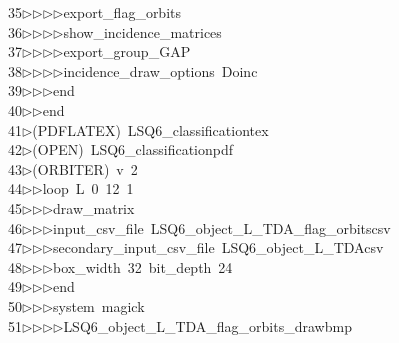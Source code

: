 \begin{tabbing}
35\>$\triangleright$\>$\triangleright$\>$\triangleright$\>$\triangleright$\>export\_flag\_orbits\ \\[0pt]
36\>$\triangleright$\>$\triangleright$\>$\triangleright$\>$\triangleright$\>show\_incidence\_matrices\ \\[0pt]
37\>$\triangleright$\>$\triangleright$\>$\triangleright$\>$\triangleright$\>export\_group\_GAP\ \\[0pt]
38\>$\triangleright$\>$\triangleright$\>$\triangleright$\>$\triangleright$\>incidence\_draw\_options\ Doinc\ \\[0pt]
39\>$\triangleright$\>$\triangleright$\>$\triangleright$\>end\ \\[0pt]
40\>$\triangleright$\>$\triangleright$\>end\\[0pt]
41\>$\triangleright$\>(PDFLATEX)\ LSQ6\_classificationtex\\[0pt]
42\>$\triangleright$\>(OPEN)\ LSQ6\_classificationpdf\\[0pt]
43\>$\triangleright$\>(ORBITER)\ v\ 2\ \\[0pt]
44\>$\triangleright$\>$\triangleright$\>loop\ L\ 0\ 12\ 1\ \\[0pt]
45\>$\triangleright$\>$\triangleright$\>$\triangleright$\>draw\_matrix\ \\[0pt]
46\>$\triangleright$\>$\triangleright$\>$\triangleright$\>input\_csv\_file\ LSQ6\_object\_L\_TDA\_flag\_orbitscsv\ \\[0pt]
47\>$\triangleright$\>$\triangleright$\>$\triangleright$\>secondary\_input\_csv\_file\ LSQ6\_object\_L\_TDAcsv\ \\[0pt]
48\>$\triangleright$\>$\triangleright$\>$\triangleright$\>box\_width\ 32\ bit\_depth\ 24\ \\[0pt]
49\>$\triangleright$\>$\triangleright$\>$\triangleright$\>end\ \\[0pt]
50\>$\triangleright$\>$\triangleright$\>$\triangleright$\>system\ magick\ \\[0pt]
51\>$\triangleright$\>$\triangleright$\>$\triangleright$\>$\triangleright$\>LSQ6\_object\_L\_TDA\_flag\_orbits\_drawbmp\ \\[0pt]

\end{tabbing}
